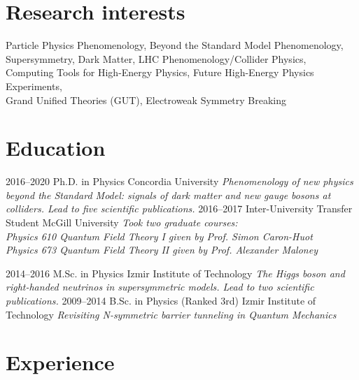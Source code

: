 \documentclass[]{friggeri-cv}
\begin{document}
\section{Research interests}

Particle Physics Phenomenology, Beyond the Standard Model Phenomenology, \\
Supersymmetry, Dark Matter, LHC Phenomenology/Collider Physics, \\
Computing Tools for High-Energy Physics, Future High-Energy Physics Experiments, \\
Grand Unified Theories (GUT), Electroweak Symmetry Breaking \\

\section{Education}
\begin{entrylist}
  \entry
    {2016--2020}
    {Ph.D. in Physics}
    {Concordia University}
    {\emph{Phenomenology of new physics beyond the Standard Model: signals of dark matter and new gauge bosons at colliders. Lead to five scientific publications.}}
   \entry
   {2016--2017}
   {Inter-University Transfer Student}
   {McGill University}
   {\emph{Took two graduate courses: \\
      Physics 610 Quantum Field Theory I given by Prof. Simon Caron-Huot \\
      Physics 673 Quantum Field Theory II given by Prof. Alexander Maloney }}
   
  \entry
    {2014–2016}
    {M.Sc. in Physics}
    {Izmir Institute of Technology}
    {\emph{The Higgs boson and right-handed neutrinos in supersymmetric models. Lead to two scientific publications.}}
  \entry
    {2009–2014}
    {B.Sc. in Physics (Ranked 3rd)}
    {Izmir Institute of Technology}
    {\emph{Revisiting N-symmetric barrier tunneling in Quantum Mechanics}}
    

\end{entrylist}

\section{Experience}
\end{document}
